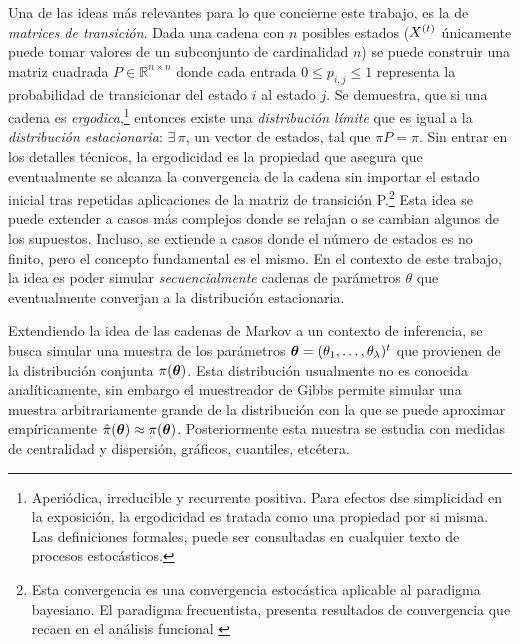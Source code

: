 \documentclass[../Main/Main.tex]{subfiles}
\begin{document}
Una de las ideas más relevantes para lo que concierne este trabajo, es la de \textit{matrices de transición}. Dada una cadena con $n$ posibles estados ($X^{(t)}$ únicamente puede tomar valores de un subconjunto de cardinalidad $n$) se puede construir una matriz cuadrada $P\in\mathbb{R}^{n\times n}$ donde cada entrada $0\leq p_{i,j}\leq1$ representa la probabilidad de transicionar del estado $i$ al estado $j$. Se demuestra, que si una cadena es \textit{ergodica},\footnote{Aperiódica, irreducible y  recurrente positiva. Para efectos dse simplicidad en la exposición, la ergodicidad es tratada como una propiedad por si misma. Las definiciones formales, puede ser consultadas en cualquier texto de procesos estocásticos.} entonces existe una \textit{distribución límite} que es igual a la \textit{distribución estacionaria}: $\exists \,\pi$, un vector de estados, tal que $\pi P = \pi$. Sin entrar en los detalles técnicos, la ergodicidad es la propiedad que asegura que eventualmente se alcanza la convergencia de la cadena sin importar el estado inicial tras repetidas aplicaciones de la matriz de transición P.\footnote{Esta convergencia es una convergencia estocástica aplicable al paradigma bayesiano. El paradigma frecuentista, presenta resultados de convergencia que recaen en el análisis funcional \autocite{stone1985additive}} 
Esta idea se puede extender a casos más complejos donde se relajan o se cambian algunos de los supuestos. Incluso, se extiende a casos donde el número de estados es no finito, pero el concepto fundamental es el mismo.  En el contexto de este trabajo, la idea es poder simular \textit{secuencialmente} cadenas de parámetros $\theta$ que eventualmente converjan a la distribución estacionaria. 

Extendiendo la idea de las cadenas de Markov a un contexto de inferencia, se busca simular una muestra de los parámetros \linebreak $\bm{\theta} = (\theta_1,\ldots,\theta_\lambda)^t$ que provienen de la distribución conjunta $\pi(\bm{\theta})$. Esta distribución usualmente no es conocida analíticamente, sin embargo el muestreador de Gibbs permite simular una muestra arbitrariamente grande de la distribución con la que se puede aproximar empíricamente $\hat{\pi}(\bm{\theta}) \approx \pi(\bm{\theta})$. Posteriormente esta muestra se estudia con medidas de centralidad y dispersión, gráficos, cuantiles, etcétera.
\end{document}
